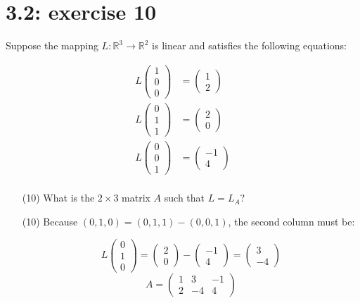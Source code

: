 \documentclass{report}
\begin{document}
\section*{3.2: exercise 10} 
Suppose the mapping $L: \mathbb{R}^3 \to \mathbb{R}^2$ is linear and satisfies the following equations:

\begin{align*}
L \begin{pmatrix} 1 \\ 0 \\ 0 \end{pmatrix} &= \begin{pmatrix} 1 \\ 2 \end{pmatrix} \\
L \begin{pmatrix} 0 \\ 1 \\ 1 \end{pmatrix} &= \begin{pmatrix} 2 \\ 0 \end{pmatrix} \\
L \begin{pmatrix} 0 \\ 0 \\ 1 \end{pmatrix} &= \begin{pmatrix} -1 \\ 4 \end{pmatrix}\\
\end{align*}
\begin{enumerate}
    \item[(10)] What is the  $2\times 3$ matrix $A$ such that $L = L_A$?


\end{enumerate}


\sol

\begin{enumerate}
\item[(10)]
Because $(0,1,0) = (0,1,1) - (0,0,1)$,  the second column must be:

\[
L \begin{pmatrix} 0 \\ 1\\ 0 \end{pmatrix} = \left(\begin{array}{c} 2 \\ 0 \end{array}\right) - \left(\begin{array}{r} -1 \\ 4 \end{array}\right) = \begin{pmatrix} 3 \\ -4 \end{pmatrix}
\]
\[
A = \boxed{\begin{pmatrix}
1 & 3 & -1 \\
2 & -4 & 4
\end{pmatrix}}
\]
\end{enumerate}
\end{document}
